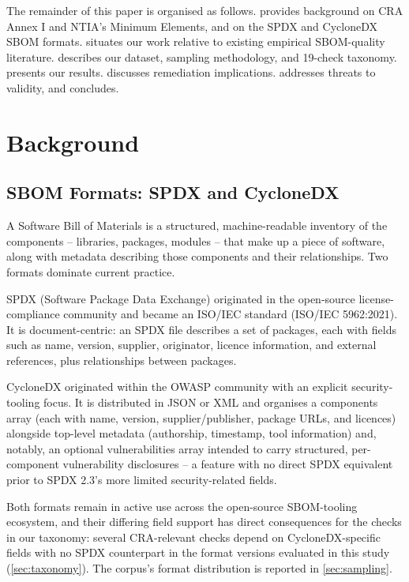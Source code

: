 \documentclass[11pt]{article}
\begin{document}
The remainder of this paper is organised as follows.  provides background on CRA Annex I and NTIA's Minimum Elements, and on the SPDX and CycloneDX SBOM formats.  situates our work relative to existing empirical SBOM-quality literature.  describes our dataset, sampling methodology, and 19-check taxonomy.  presents our results.  discusses remediation implications.  addresses threats to validity, and  concludes.

\section{Background}
\label{sec:background}

\subsection{SBOM Formats: SPDX and CycloneDX}

A Software Bill of Materials is a structured, machine-readable inventory of the components -- libraries, packages, modules -- that make up a piece of software, along with metadata describing those components and their relationships. Two formats dominate current practice.

SPDX (Software Package Data Exchange) originated in the open-source license-compliance community and became an ISO/IEC standard (ISO/IEC 5962:2021). It is document-centric: an SPDX file describes a set of packages, each with fields such as name, version, supplier, originator, licence information, and external references, plus relationships between packages.

CycloneDX originated within the OWASP community with an explicit security-tooling focus. It is distributed in JSON or XML and organises a components array (each with name, version, supplier/publisher, package URLs, and licences) alongside top-level metadata (authorship, timestamp, tool information) and, notably, an optional vulnerabilities array intended to carry structured, per-component vulnerability disclosures -- a feature with no direct SPDX equivalent prior to SPDX 2.3's more limited security-related fields.

Both formats remain in active use across the open-source SBOM-tooling ecosystem, and their differing field support has direct consequences for the checks in our taxonomy: several CRA-relevant checks depend on CycloneDX-specific fields with no SPDX counterpart in the format versions evaluated in this study (\cref{sec:taxonomy}). The corpus's format distribution is reported in \cref{sec:sampling}.
\end{document}
